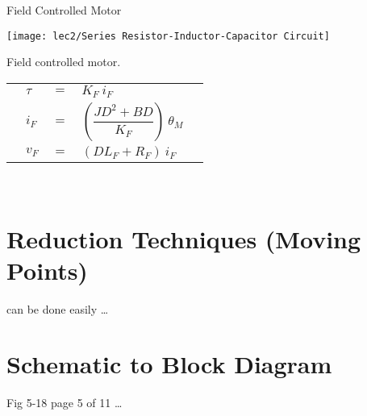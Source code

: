 Field Controlled Motor\\[-1mm]
\begin{marginfigure}[-1em]
		\texttt{[image: lec2/Series Resistor-Inductor-Capacitor Circuit]}
		\caption{Field controlled motor.}
\end{marginfigure}

\begin{tabular}{C{1mm} C{1mm} C{2cm} l l}
			&$\tau$& $=$ & $K_F\ i_F$ &\\
			&$i_F $& $=$ & $(\dfrac{JD^2+BD}{K_F})\ \theta_M$ &\\
			&$v_F $& $=$ & $(DL_F+R_F)\ i_F$&\\
\end{tabular}

\vspace{-1em}
\hspace*{\fill}\\

\section[Block Diagram Reduction $_{p\ 2}$]{Reduction Techniques (Moving Points)}
can be done easily \ldots\\

\section{Schematic to Block Diagram}
Fig 5-18 page 5 of 11 \ldots\\
